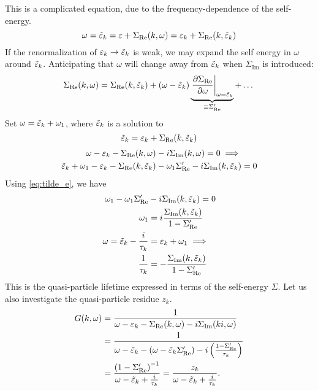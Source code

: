 This is a complicated equation, due to the frequency-dependence of the self-energy. 
\begin{equation} 
\omega = \tilde{\varepsilon}_k = \varepsilon + \Sigma_{\text{Re}}(k, \omega)  = \varepsilon_k + \Sigma_{\text{Re}}(k, \tilde{\varepsilon}_k)
\end{equation}
If the renormalization of $\varepsilon_k \rightarrow \tilde{\varepsilon}_k$ is weak, we may expand the self energy in $\omega$ around $\tilde{\varepsilon}_k$. Anticipating that $\omega$ will change away from $\tilde{\varepsilon}_k$ when $\Sigma_{\text{Im}}$ is introduced:
\begin{equation} 
\Sigma_{\text{Re}}(k,\omega) = \Sigma_{\text{Re}}(k,\tilde{\varepsilon}_k) + (\omega-\tilde{\varepsilon}_k)\underbrace{\left.\pdv{\Sigma_{\text{Re}}}{\omega}\right|_{\omega =  \tilde{\varepsilon}_k}}_{\equiv \Sigma_{\text{Re}}'} + \dots
\end{equation}
Set $\omega = \tilde{\varepsilon}_k + \omega_1$, where $\tilde{\varepsilon}_k$ is a solution to 
\begin{equation}
\label{eq:tilde_e} 
\tilde{\varepsilon}_k = \varepsilon_k + \Sigma_{\text{Re}}(k, \tilde{\varepsilon}_k)
\end{equation}
\begin{align*} 
\omega-  \varepsilon_k - \Sigma_{\text{Re}}(k, \omega) &- i\Sigma_{\text{Im}}(k, \omega) = 0 \implies \\
\tilde{\varepsilon}_k + \omega_1 - \varepsilon_k - \Sigma_{\text{Re}}(k, \tilde{\varepsilon}_k) & - \omega_1\Sigma_{\text{Re}}' - i\Sigma_{\text{Im}}(k, \tilde{\varepsilon}_k) = 0
\end{align*}
Using \cref{eq:tilde_e}, we have
\begin{align*} 
\omega_1 - \omega_1\Sigma_{\text{Re}}' &- i\Sigma_{\text{Im}}(k, \tilde{\varepsilon}_k) = 0 \\
\omega_1 &= i\frac{\Sigma_{\text{Im}}(k, \tilde{\varepsilon}_k)}{1-\Sigma_{\text{Re}}'} \\
\omega = \tilde{\varepsilon}_k-\frac{i}{\tau_k} &= \varepsilon_k + \omega_1 \implies \\
\frac{1}{\tau_k} &= -\frac{\Sigma_{\text{Im}}(k, \tilde{\varepsilon}_k)}{1-\Sigma_{\text{Re}}'}
\end{align*}
This is the quasi-particle lifetime expressed in terms of the self-energy $\Sigma$.
Let us also investigate the quasi-particle residue $z_k$.
\begin{align*} 
G(k, \omega) &= \frac{1}{\omega-\varepsilon_k-\Sigma_{\text{Re}}(k, \omega) - i\Sigma_{\text{Im}}(ki, \omega)} \\
&= \frac{1}{\omega-\tilde{\varepsilon}_k -(\omega-\tilde{\varepsilon}_k\Sigma_{\text{Re}}') -i\left(\frac{1-\Sigma_{\text{Re}}'}{\tau_k}\right)} \\
&= \frac{\left(1-\Sigma_{\text{Re}}'\right)^{-1}}{\omega-\tilde{\varepsilon}_k + \frac{i}{\tau_k}} = \frac{z_k}{\omega - \tilde{\varepsilon}_k + \frac{i}{\tau_k}}.
\end{align*}

